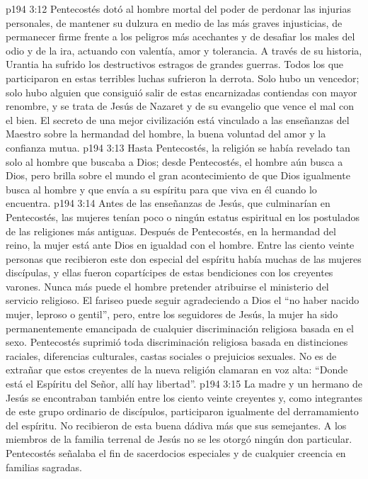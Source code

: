 \vs p194 3:12 Pentecostés dotó al hombre mortal del poder de perdonar las injurias personales, de mantener su dulzura en medio de las más graves injusticias, de permanecer firme frente a los peligros más acechantes y de desafiar los males del odio y de la ira, actuando con valentía, amor y tolerancia. A través de su historia, Urantia ha sufrido los destructivos estragos de grandes guerras. Todos los que participaron en estas terribles luchas sufrieron la derrota. Solo hubo un vencedor; solo hubo alguien que consiguió salir de estas encarnizadas contiendas con mayor renombre, y se trata de Jesús de Nazaret y de su evangelio que vence el mal con el bien. El secreto de una mejor civilización está vinculado a las enseñanzas del Maestro sobre la hermandad del hombre, la buena voluntad del amor y la confianza mutua.
\vs p194 3:13 Hasta Pentecostés, la religión se había revelado tan solo al hombre que buscaba a Dios; desde Pentecostés, el hombre aún busca a Dios, pero brilla sobre el mundo el gran acontecimiento de que Dios igualmente busca al hombre y que envía a su espíritu para que viva en él cuando lo encuentra.
\vs p194 3:14 \pc Antes de las enseñanzas de Jesús, que culminarían en Pentecostés, las mujeres tenían poco o ningún estatus espiritual en los postulados de las religiones más antiguas. Después de Pentecostés, en la hermandad del reino, la mujer está ante Dios en igualdad con el hombre. Entre las ciento veinte personas que recibieron este don especial del espíritu había muchas de las mujeres discípulas, y ellas fueron copartícipes de estas bendiciones con los creyentes varones. Nunca más puede el hombre pretender atribuirse el ministerio del servicio religioso. El fariseo puede seguir agradeciendo a Dios el “no haber nacido mujer, leproso o gentil”, pero, entre los seguidores de Jesús, la mujer ha sido permanentemente emancipada de cualquier discriminación religiosa basada en el sexo. Pentecostés suprimió toda discriminación religiosa basada en distinciones raciales, diferencias culturales, castas sociales o prejuicios sexuales. No es de extrañar que estos creyentes de la nueva religión clamaran en voz alta: “Donde está el Espíritu del Señor, allí hay libertad”.
\vs p194 3:15 \pc La madre y un hermano de Jesús se encontraban también entre los ciento veinte creyentes y, como integrantes de este grupo ordinario de discípulos, participaron igualmente del derramamiento del espíritu. No recibieron de esta buena dádiva más que sus semejantes. A los miembros de la familia terrenal de Jesús no se les otorgó ningún don particular. Pentecostés señalaba el fin de sacerdocios especiales y de cualquier creencia en familias sagradas.
